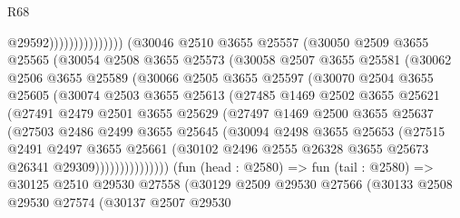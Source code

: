 \begin{lexlean}{R68}
\begin{coremodule}
                                      @29592)))))))))))))))
        (@30046
          @2510
          @3655
          @25557
          (@30050
            @2509
            @3655
            @25565
            (@30054
              @2508
              @3655
              @25573
              (@30058
                @2507
                @3655
                @25581
                (@30062
                  @2506
                  @3655
                  @25589
                  (@30066
                    @2505
                    @3655
                    @25597
                    (@30070
                      @2504
                      @3655
                      @25605
                      (@30074
                        @2503
                        @3655
                        @25613
                        (@27485
                          @1469
                          @2502
                          @3655
                          @25621
                          (@27491
                            @2479
                            @2501
                            @3655
                            @25629
                            (@27497
                              @1469
                              @2500
                              @3655
                              @25637
                              (@27503
                                @2486
                                @2499
                                @3655
                                @25645
                                (@30094
                                  @2498
                                  @3655
                                  @25653
                                  (@27515
                                    @2491
                                    @2497
                                    @3655
                                    @25661
                                    (@30102
                                      @2496
                                      @2555
                                      @26328
                                      @3655
                                      @25673
                                      @26341
                                      @29309)))))))))))))))
        (fun (head : @2580) =>
        fun (tail : @2580) =>
        @30125
          @2510
          @29530
          @27558
          (@30129
            @2509
            @29530
            @27566
            (@30133
              @2508
              @29530
              @27574
              (@30137
                @2507
                @29530

\end{coremodule}
\end{lexlean}
